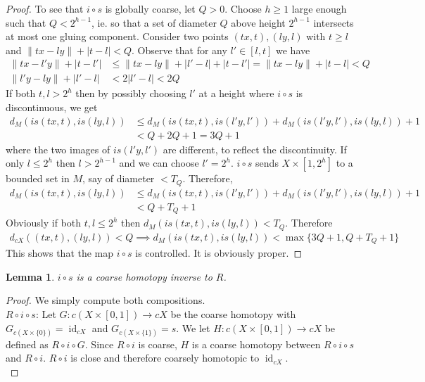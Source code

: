 \documentclass[a4paper,11pt]{article}
\theoremstyle{definition}
\theoremstyle{plain}
\newtheorem{lemma}[definition]{Lemma}
\theoremstyle{remark}
\DeclareMathOperator{\id}{id}
\begin{document}
{\begin{proof}
To see that $i\circ s$ is globally coarse, let $Q>0$. Choose $h\geq 1$ large enough such that $Q<2^{h-1}$, ie. so that a set of diameter $Q$ above height $2^{h-1}$ intersects at most one gluing component.  Consider two points $(tx,t),(ly,l)$ with $t\geq l$ and $\|tx-ly\| + |t-l| < Q$. Observe that for any $l'\in [l,t]$ we have 
\begin{align*}
\|tx-l'y\| + |t-l'|&\leq \|tx-ly\| + |l'-l| + |t-l'| = \|tx-ly\| + |t-l| <Q\\
\|l'y - ly\| + |l'-l| &< 2 |l'-l|< 2Q
\end{align*} If both $t,l > 2^h$ then by possibly choosing $l'$ at a height where $i\circ s$ is discontinuous, we get 
\begin{align*}
d_{M}(is(tx,t), is(ly,l)) &\leq d_{M}(is(tx,t), is(l'y,l'))+ d_{M}(is(l'y,l'), is(ly,l)) + 1 \\
&< Q + 2Q +1 = 3Q+1
\end{align*} 
where the two images of $is(l'y,l')$ are different, to reflect the discontinuity. If only $l\leq 2^h$ then $l>2^{h-1}$ and we can choose $l'= 2^h$.  $i\circ s$ sends $X \times [1,2^h]$ to a bounded set in $M$, say of diameter $<T_{Q}$. Therefore, 
\begin{align*}
d_{M}(is(tx,t), is(ly,l)) &\leq d_{M}(is(tx,t), is(l'y,l'))+ d_{M}(is(l'y,l'), is(ly,l)) + 1 \\
&< Q + T_{Q} +1 
\end{align*} 
Obviously if both $t,l \leq 2^h$ then $d_{M}(is(tx,t), is(ly,l))< T_{Q}$. Therefore
\begin{align*}
d_{cX}((tx,t),(ly,l)) < Q \implies d_{M}(is(tx,t), is(ly,l)) < \max \{3Q+1, Q + T_{Q} +1 \}
\end{align*}
This shows that the map $i \circ s$ is controlled. It is obviously proper.  
\end{proof}



\begin{lemma} \label{chi} $i \circ s$ is a coarse homotopy inverse to $R$. 
\end{lemma}

\begin{proof} We simply compute both compositions. \\


$R \circ i \circ s$: Let $G: c(X\times [0,1]) \rightarrow cX$ be the coarse homotopy with $G_{c(X\times \{0\})} = \id_{cX}$ and $G_{c(X \times \{1\})} = s$. We let $H: c(X\times [0,1])\rightarrow cX$ be defined as $R \circ i \circ G$. Since $R \circ i$ is coarse, $H$ is a coarse homotopy between $R \circ i \circ s$ and $R \circ i$. $R\circ i$ is close and therefore coarsely homotopic to $\id_{cX}$. \\



\end{proof}}
\end{document}
